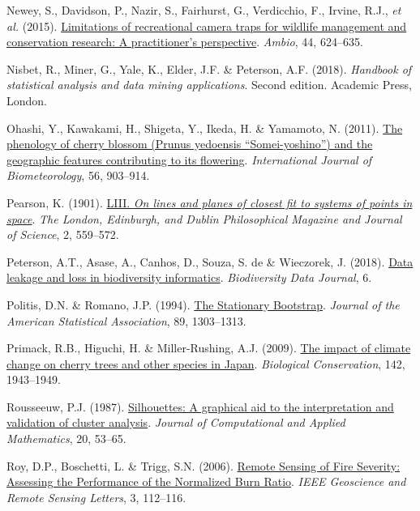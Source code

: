 \documentclass[
  letterpaper,
]{scrbook}
\newlength{\cslhangindent}
\newenvironment{CSLReferences}[2] %
 {\begin{list}{}{%
  \setlength{\itemindent}{0pt}
  \setlength{\leftmargin}{0pt}
  \setlength{\parsep}{0pt}
  \ifodd #1
   \setlength{\leftmargin}{\cslhangindent}
   \setlength{\itemindent}{-1\cslhangindent}
  \fi
  \setlength{\itemsep}{#2\baselineskip}}}
 {\end{list}}
\begin{document}
\begin{CSLReferences}{1}{0}
Newey, S., Davidson, P., Nazir, S., Fairhurst, G., Verdicchio, F.,
Irvine, R.J., \emph{et al.} (2015).
\href{https://doi.org/10.1007/s13280-015-0713-1}{Limitations of
recreational camera traps for wildlife management and conservation
research: A practitioner{'}s perspective}. \emph{Ambio}, 44, 624--635.

Nisbet, R., Miner, G., Yale, K., Elder, J.F. \& Peterson, A.F. (2018).
\emph{Handbook of statistical analysis and data mining applications}.
Second edition. Academic Press, London.

Ohashi, Y., Kawakami, H., Shigeta, Y., Ikeda, H. \& Yamamoto, N. (2011).
\href{https://doi.org/10.1007/s00484-011-0496-4}{The phenology of cherry
blossom (Prunus yedoensis {``}Somei-yoshino{''}) and the geographic
features contributing to its flowering}. \emph{International Journal of
Biometeorology}, 56, 903--914.

Pearson, K. (1901).
\href{https://doi.org/10.1080/14786440109462720}{LIII. {\emph{On lines
and planes of closest fit to systems of points in space}}}. \emph{The
London, Edinburgh, and Dublin Philosophical Magazine and Journal of
Science}, 2, 559--572.

Peterson, A.T., Asase, A., Canhos, D., Souza, S. de \& Wieczorek, J.
(2018). \href{https://doi.org/10.3897/bdj.6.e26826}{Data leakage and
loss in biodiversity informatics}. \emph{Biodiversity Data Journal}, 6.

Politis, D.N. \& Romano, J.P. (1994).
\href{https://doi.org/10.1080/01621459.1994.10476870}{The Stationary
Bootstrap}. \emph{Journal of the American Statistical Association}, 89,
1303--1313.

Primack, R.B., Higuchi, H. \& Miller-Rushing, A.J. (2009).
\href{https://doi.org/10.1016/j.biocon.2009.03.016}{The impact of
climate change on cherry trees and other species in Japan}.
\emph{Biological Conservation}, 142, 1943--1949.

Rousseeuw, P.J. (1987).
\href{https://doi.org/10.1016/0377-0427(87)90125-7}{Silhouettes: A
graphical aid to the interpretation and validation of cluster analysis}.
\emph{Journal of Computational and Applied Mathematics}, 20, 53--65.

Roy, D.P., Boschetti, L. \& Trigg, S.N. (2006).
\href{https://doi.org/10.1109/lgrs.2005.858485}{Remote Sensing of Fire
Severity: Assessing the Performance of the Normalized Burn Ratio}.
\emph{IEEE Geoscience and Remote Sensing Letters}, 3, 112--116.


\end{CSLReferences}
\end{document}
